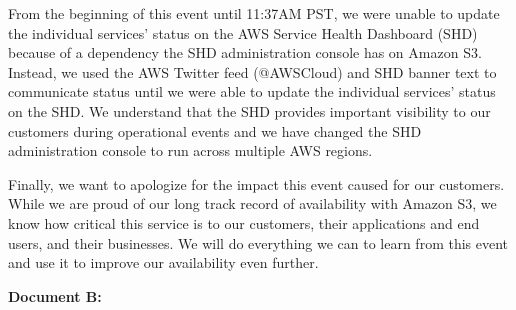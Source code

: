 \documentclass{report}
\begin{document}
\begin{spacing}{1.4}
\begin{enumerate}[leftmargin=*]

      From the beginning of this event until 11:37AM PST, we were unable to update the individual services’ status on the AWS Service Health Dashboard (SHD) because of a dependency the SHD administration console has on Amazon S3. Instead, we used the AWS Twitter feed (@AWSCloud) and SHD banner text to communicate status until we were able to update the individual services’ status on the SHD.  We understand that the SHD provides important visibility to our customers during operational events and we have changed the SHD administration console to run across multiple AWS regions.

      Finally, we want to apologize for the impact this event caused for our customers. While we are proud of our long track record of availability with Amazon S3, we know how critical this service is to our customers, their applications and end users, and their businesses. We will do everything we can to learn from this event and use it to improve our availability even further.~
    
\vspace{0.5in}
    \textbf{Document B:}


\end{enumerate}
\end{spacing}
\end{document}
